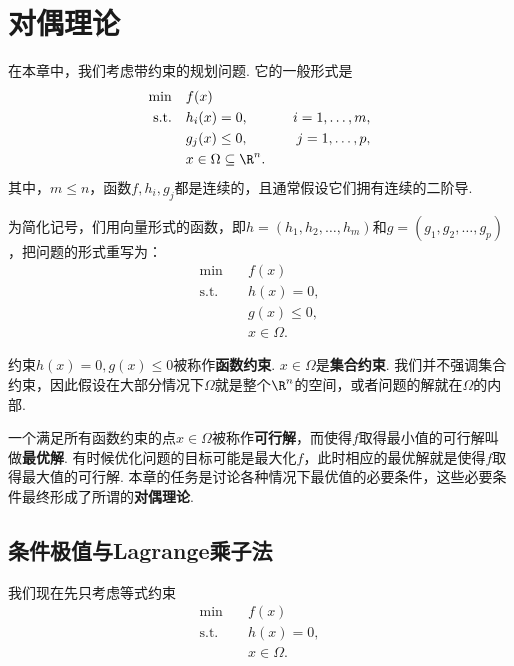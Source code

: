 \chapter{对偶理论}\label{chap:duality}
在本章中，我们考虑带约束的规划问题. 它的一般形式是
        \begin{alignat*}{2}
        \min\quad&f({x}) \\
        \text{s.t.}\quad&h_i({x})=0,&\quad i=1,\dots,m,\\
        &g_j(x)\leq 0,&\quad j=1,\dots,p,\\
        &x\in\Omega\subseteq\R^n.
        \end{alignat*}
其中，$m\leq n$，函数$f,h_i,g_j$都是连续的，且通常假设它们拥有连续的二阶导. 

为简化记号，们用向量形式的函数，即${h}=(h_1,h_2,\dots,h_m)$和${g}=(g_1,g_2,\dots,g_p)$，把问题的形式重写为：
    \begin{align*}
        \min\quad& f({x}) \\
        \text{s.t.}\quad& {h}({x})={0},\\
        & {g}({x})\leq {0}, \\
        & {x} \in \Omega.
    \end{align*}

约束${h}({x})={0},{g}({x})\le{0}$被称作\textbf{函数约束}. ${x}\in\Omega$是\textbf{集合约束}. 我们并不强调集合约束，因此假设在大部分情况下$\Omega$就是整个$\R^n$的空间，或者问题的解就在$\Omega$的内部. 

一个满足所有函数约束的点${x}\in\Omega$被称作\textbf{可行解}，而使得$f$取得最小值的可行解叫做\textbf{最优解}. 有时候优化问题的目标可能是最大化$f$，此时相应的最优解就是使得$f$取得最大值的可行解. 本章的任务是讨论各种情况下最优值的必要条件，这些必要条件最终形成了所谓的\textbf{对偶理论}. 

\section{条件极值与Lagrange乘子法}
我们现在先只考虑等式约束
\begin{equation}
\begin{aligned}
        \min\quad& f({x}) \\
        \text{s.t.}\quad& {h}({x})={0},\\
        & {x} \in \Omega.
\end{aligned}    \label{eq:eq-constraint-only-differentiable}
\end{equation}

